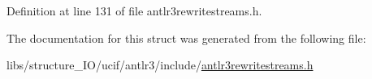 Definition at line 131 of file antlr3rewritestreams.\-h.



The documentation for this struct was generated from the following file\-:\begin{DoxyCompactItemize}
\item 
libs/structure\-\_\-\-I\-O/ucif/antlr3/include/\hyperlink{antlr3rewritestreams_8h}{antlr3rewritestreams.\-h}\end{DoxyCompactItemize}
